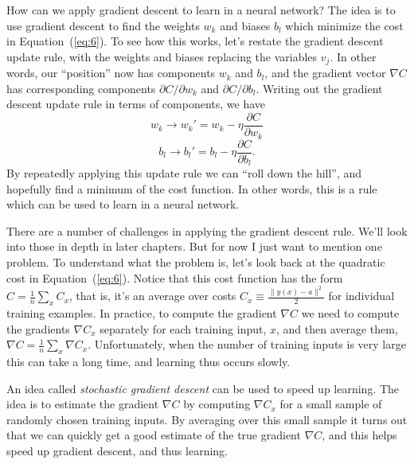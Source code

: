 \documentclass[a4paper,twoside,10pt]{book}
\begin{document}
How can we apply gradient descent to learn in a neural network? The idea is to use gradient descent to find the weights $w_k$ and biases $b_l$ which minimize the cost in Equation~(\ref{eq:6}). To see how this works, let's restate the gradient descent update rule, with the weights and biases replacing the variables $v_j$. In other words, our ``position'' now has components $w_k$ and $b_l$, and the gradient vector $\nabla C$ has corresponding components $\partial C/\partial w_k$ and $\partial C / \partial b_l$. Writing out the gradient descent update rule in terms of components, we have
\begin{equation}
w_k  \to w_k' = w_k-\eta \frac{\partial C}{\partial w_k} \tag{16}\label{eq:16}
\end{equation}
\begin{equation}
b_l  \to b_l' = b_l-\eta \frac{\partial C}{\partial b_l}.\tag{17}\label{eq:17}
\end{equation}
By repeatedly applying this update rule we can ``roll down the hill'', and hopefully find a minimum of the cost function. In other words, this is a rule which can be used to learn in a neural network.

There are a number of challenges in applying the gradient descent rule. We'll look into those in depth in later chapters. But for now I just want to mention one problem. To understand what the problem is, let's look back at the quadratic cost in Equation~(\ref{eq:6}). Notice that this cost function has the form $C = \frac{1}{n} \sum_x C_x$, that is, it's an average over costs $C_x \equiv \frac{\|y(x)-a\|^2}{2}$ for individual training examples. In practice, to compute the gradient $\nabla C$ we need to  compute the gradients $\nabla C_x$ separately for each training input, $x$, and then average them, $\nabla C = \frac{1}{n}\sum_x \nabla C_x$. Unfortunately, when the number of training inputs is very large this can take a long time, and learning thus occurs slowly.

An idea called \textit{stochastic gradient descent} can be used to speed up learning. The idea is to estimate the gradient $\nabla C$ by computing $\nabla C_x$ for a small sample of randomly chosen training inputs. By averaging over this small sample it turns out that we can quickly get a good estimate of the true gradient $\nabla C$, and this helps speed up gradient descent, and thus learning.
\end{document}
